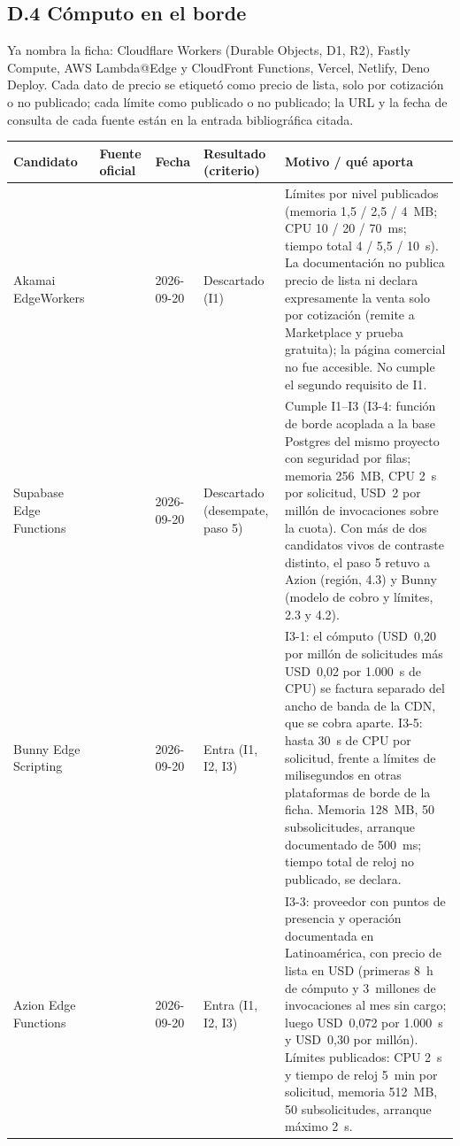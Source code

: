 \documentclass[12pt, letterpaper, table, xcdraw]{inf-pucv}
\begin{document}
\subsection*{D.4 Cómputo en el borde}

Ya nombra la ficha: Cloudflare Workers (Durable Objects, D1, R2), Fastly Compute, AWS Lambda@Edge y CloudFront Functions, Vercel, Netlify, Deno Deploy. Cada dato de precio se etiquetó como precio de lista, solo por cotización o no publicado; cada límite como publicado o no publicado; la URL y la fecha de consulta de cada fuente están en la entrada bibliográfica citada.

{\scriptsize
\begin{longtable}{|p{2.5cm}|p{2.4cm}|p{1.4cm}|p{2.3cm}|p{5.2cm}|}
    \hline
    \textbf{Candidato} & \textbf{Fuente oficial} & \textbf{Fecha} & \textbf{Resultado (criterio)} & \textbf{Motivo / qué aporta} \\
    \hline
    \endhead
    Akamai EdgeWorkers & \parencite{akamai2026edgeworkerslimits,akamai2026edgeworkersbilling} & 2026-09-20 & Descartado (I1) & Límites por nivel publicados (memoria 1,5 / 2,5 / 4~MB; CPU 10 / 20 / 70~ms; tiempo total 4 / 5,5 / 10~s). La documentación no publica precio de lista ni declara expresamente la venta solo por cotización (remite a Marketplace y prueba gratuita); la página comercial no fue accesible. No cumple el segundo requisito de I1. \\ \hline
    Supabase Edge Functions & \parencite{supabase2026edgefunctionslimits,supabase2026edgefunctionsbilling} & 2026-09-20 & Descartado (desempate, paso 5) & Cumple I1--I3 (I3-4: función de borde acoplada a la base Postgres del mismo proyecto con seguridad por filas; memoria 256~MB, CPU 2~s por solicitud, USD~2 por millón de invocaciones sobre la cuota). Con más de dos candidatos vivos de contraste distinto, el paso 5 retuvo a Azion (región, 4.3) y Bunny (modelo de cobro y límites, 2.3 y 4.2). \\ \hline
    Bunny Edge Scripting & \parencite{bunny2026scriptingpricing,bunny2026scriptinglimits} & 2026-09-20 & Entra (I1, I2, I3) & I3-1: el cómputo (USD~0,20 por millón de solicitudes más USD~0,02 por 1.000~s de CPU) se factura separado del ancho de banda de la CDN, que se cobra aparte. I3-5: hasta 30~s de CPU por solicitud, frente a límites de milisegundos en otras plataformas de borde de la ficha. Memoria 128~MB, 50 subsolicitudes, arranque documentado de 500~ms; tiempo total de reloj no publicado, se declara. \\ \hline
    Azion Edge Functions & \parencite{azion2026pricing,azion2026functionslimits} & 2026-09-20 & Entra (I1, I2, I3) & I3-3: proveedor con puntos de presencia y operación documentada en Latinoamérica, con precio de lista en USD (primeras 8~h de cómputo y 3~millones de invocaciones al mes sin cargo; luego USD~0,072 por 1.000~s y USD~0,30 por millón). Límites publicados: CPU 2~s y tiempo de reloj 5~min por solicitud, memoria 512~MB, 50 subsolicitudes, arranque máximo 2~s. \\ \hline

\end{longtable}}
\end{document}
